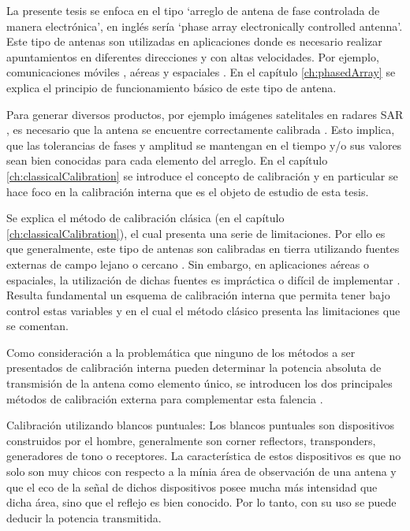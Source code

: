 La presente tesis se enfoca en el tipo \enquote*{arreglo de antena de fase controlada de manera electrónica}, en inglés 
sería \enquote*{phase array electronically controlled antenna}. Este tipo de antenas son utilizadas en aplicaciones donde 
es necesario realizar apuntamientos en diferentes direcciones y con altas velocidades. Por ejemplo, comunicaciones móviles 
\cite{Chen2012}, aéreas \cite{MHong1989} y espaciales \cite{Shimada1995}\cite{Makhoul2012}. En el capítulo 
\ref{ch:phasedArray} se explica el principio de funcionamiento básico de este tipo de antena. 

Para generar diversos productos, por ejemplo imágenes satelitales en radares SAR \cite{Freeman1992}, es necesario que la 
antena se encuentre correctamente calibrada \cite{Luscombe1990}\cite{Seifert1996}\cite{Dall1994}. Esto implica, que las 
tolerancias de fases y amplitud se mantengan en el tiempo y/o sus valores sean bien conocidas para cada elemento del arreglo. 
En el capítulo \ref{ch:classicalCalibration} se introduce el concepto de calibración y en particular se hace foco en la 
calibración interna que es el objeto de estudio de esta tesis.

Se explica el método de calibración clásica (en el capítulo \ref{ch:classicalCalibration}), el cual presenta una serie de 
limitaciones. Por ello es que generalmente, este tipo de antenas son calibradas en tierra utilizando fuentes externas de campo 
lejano o cercano \cite{Agrawal2003}. Sin embargo, en aplicaciones aéreas o espaciales, la utilización de dichas fuentes es 
impráctica o difícil de implementar \cite{Aumann1989}. Resulta fundamental un esquema de calibración interna que permita 
tener bajo control estas variables y en el cual el método clásico presenta las limitaciones que se comentan. 

Como consideración a la problemática que ninguno de los métodos a ser presentados de calibración interna pueden determinar
la potencia absoluta de transmisión de la antena como elemento único, se introducen los dos principales métodos de 
calibración externa para complementar esta falencia . 

Calibración utilizando blancos puntuales: Los blancos puntuales son dispositivos construidos por el hombre, generalmente son
corner reflectors, transponders, generadores de tono o receptores. La característica de estos dispositivos es que no solo 
son muy chicos con respecto a la mínia área de observación de una antena y que el eco de la señal de dichos dispositivos 
posee mucha más intensidad que dicha área, sino que el reflejo es bien conocido. Por lo tanto, con su uso se puede deducir la 
potencia transmitida.

